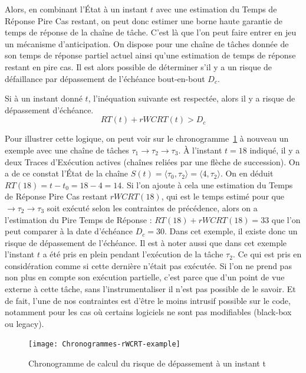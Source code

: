 \documentclass[french, a4paper, 11pt, twoside, pdftex]{StyleThese}
\begin{document}
    Alors, en combinant l'État à un instant $t$ avec une estimation du Temps de Réponse Pire Cas restant, on peut donc estimer une borne haute garantie de temps de réponse de la chaîne de tâche. C'est là que l'on peut faire entrer en jeu un mécanisme d'anticipation. 
    On dispose pour une chaîne de tâches donnée de son temps de réponse partiel actuel ainsi qu'une estimation de temps de réponse restant en pire cas. Il est alors possible de déterminer s'il y a un risque de défaillance par dépassement de l'échéance bout-en-bout $D_c$.
    \begin{theorem}
    	Si à un instant donné $t$, l'inéquation suivante est respectée, alors il y a risque de dépassement d'échéance.
    	\begin{equation*} 
    		RT(t) + rWCRT(t) > D_c
    	\end{equation*}
    \end{theorem}

	Pour illustrer cette logique, on peut voir sur le chronogramme~\ref{fig:chronogram_rWCRT_example} à nouveau un exemple avec une chaîne de tâches $\tau_1 \rightarrow \tau_2 \rightarrow \tau_3$. À l'instant $t=18$ indiqué, il y a deux Traces d'Exécution actives (chaînes reliées par une flèche de succession). On a de ce constat l'État de la chaîne $S(t) = \langle \tau_0, \tau_2\rangle = \langle 4, \tau_{2} \rangle $.
	On en déduit $ RT(18) = t - t_0 = 18-4 = 14 $. Si l'on ajoute à cela une estimation du Temps de Réponse Pire Cas restant $rWCRT(18)$, qui est le temps estimé pour que $\rightarrow \tau_2 \rightarrow \tau_3$ soit exécuté selon les contraintes de précédence, alors on a l'estimation du Pire Temps de Réponse : $ RT(18) + rWCRT(18) = 33$ que l'on peut comparer à la date d'échéance $ D_c = 30 $. Dans cet exemple, il existe donc un risque de dépassement de l'échéance.
	Il est à noter aussi que dans cet exemple l'instant $t$ a été pris en plein pendant l'exécution de la tâche $ \tau_2 $. Ce qui est pris en considération comme si cette dernière n'était pas exécutée. Si l'on ne prend pas non plus en compte son exécution partielle, c'est parce que d'un point de vue externe à cette tâche, sans l'instrumentaliser il n'est pas possible de le savoir. Et de fait, l'une de nos contraintes est d'être le moins intrusif possible sur le code, notamment pour les cas où certains logiciels ne sont pas modifiables (black-box ou legacy). 
	
    \begin{figure}[ht]
		\centering 
		\texttt{[image: Chronogrammes-rWCRT-example]}
		\caption{Chronogramme de calcul du risque de dépassement à un instant t}
		\label{fig:chronogram_rWCRT_example}
	\end{figure}
\end{document}
